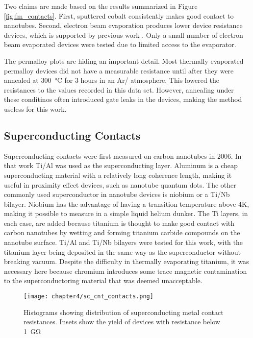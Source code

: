 Two claims are made based on the results summarized in Figure \ref{fig:fm_contacts}. First, sputtered cobalt consistently makes good contact to nanotubes. Second, electron beam evaporation produces lower device resistance devices, which is supported by previous work \cite{Churchill2012}. Only a small number of electron beam evaporated devices were tested due to limited access to the evaporator.

The permalloy plots are hiding an important detail. Most thermally evaporated permalloy devices did not have a measurable resistance until after they were annealed at \SI{300}{\celsius} for 3 hours in an Ar/ atmosphere. This lowered the resistances to the values recorded in this data set. However, annealing under these conditinos often introduced gate leaks in the devices, making the method useless for this work.

\subsection{Superconducting Contacts}

Superconducting contacts were first measured on carbon nanotubes in 2006. In that work Ti/Al was used as the superconducting layer. Aluminum is a cheap superconducting material with a relatively long coherence length, making it useful in proximity effect devices, such as nanotube quantum dots. The other commonly used superconductor in nanotube devices is niobium or a Ti/Nb bilayer. Niobium has the advantage of having a transition temperature above 4K, making it possible to measure in a simple liquid helium dunker. The Ti layers, in each case, are added because titanium is thought to make good contact with carbon nanotubes by wetting and forming titanium carbide compounds on the nanotube surface. Ti/Al and Ti/Nb bilayers were tested for this work, with the titanium layer being deposited in the same way as the superconductor without breaking vacuum. Despite the difficulty in thermally evaporating titanium, it was necessary here because chromium introduces some trace magnetic contamination to the superconductoring material that was deemed unacceptable.

\begin{figure}
    \centering
    \texttt{[image: chapter4/sc\_cnt\_contacts.png]}
    \caption{Histograms showing distribution of superconducting metal contact resistances. Insets show the yield of devices with resistance below \SI{1}{\giga\ohm}}
    \label{fig:sc_contacts}
\end{figure}

